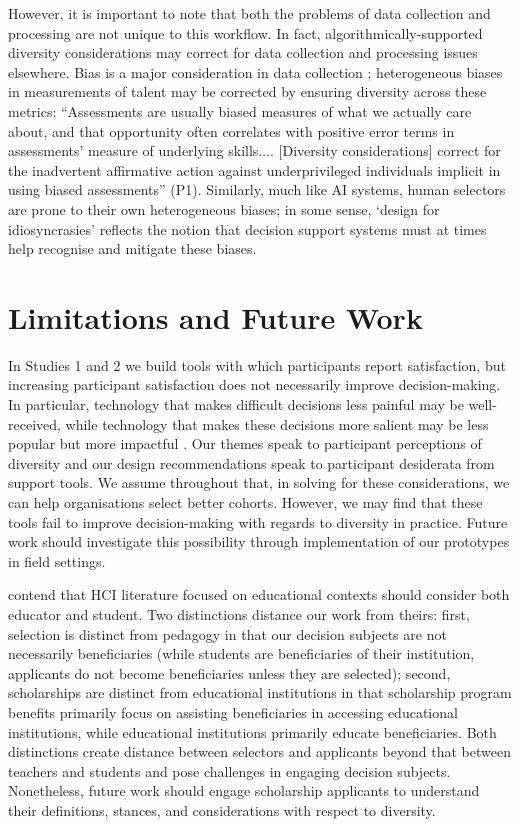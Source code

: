 However, it is important to note that both the problems of data collection and processing are not unique to this workflow. In fact, algorithmically-supported diversity considerations may correct for data collection and processing issues elsewhere. Bias is a major consideration in data collection \cite{friedler_impossibility_2016}; heterogeneous biases in measurements of talent may be corrected by ensuring diversity across these metrics: ``Assessments are usually biased measures of what we actually care about, and that opportunity often correlates with positive error terms in assessments' measure of underlying skills.... [Diversity considerations] correct for the inadvertent affirmative action against underprivileged individuals implicit in using biased assessments'' (P1). Similarly, much like AI systems, human selectors are prone to their own heterogeneous biases; in some sense, `design for idiosyncrasies' reflects the notion that decision support systems must at times help recognise and mitigate these biases.

\section{Limitations and Future Work}
In Studies 1 and 2 we build tools with which participants report satisfaction, but increasing participant satisfaction does not necessarily improve decision-making. In particular, technology that makes difficult decisions less painful may be well-received, while technology that makes these decisions more salient may be less popular but more impactful \cite{Lipton,Miller_2023}. Our themes speak to participant perceptions of diversity and our design recommendations speak to participant desiderata from support tools. We assume throughout that, in solving for these considerations, we can help organisations select better cohorts. However, we may find that these tools fail to improve decision-making with regards to diversity in practice. Future work should investigate this possibility through implementation of our prototypes in field settings.

\textcite{Venn-Wycherley_Kharrufa_Lechelt_Nicholson_Howland_Almjally_Trory_Sarangapani_2024} contend that HCI literature focused on educational contexts should consider both educator and student. Two distinctions distance our work from theirs: first, selection is distinct from pedagogy in that our decision subjects are not necessarily beneficiaries (while students are beneficiaries of their institution, applicants do not become beneficiaries unless they are selected); second, scholarships are distinct from educational institutions in that scholarship program benefits primarily focus on assisting beneficiaries in accessing educational institutions, while educational institutions primarily educate beneficiaries. Both distinctions create distance between selectors and applicants beyond that between teachers and students and pose challenges in engaging decision subjects. Nonetheless, future work should engage scholarship applicants to understand their definitions, stances, and considerations with respect to diversity. 

